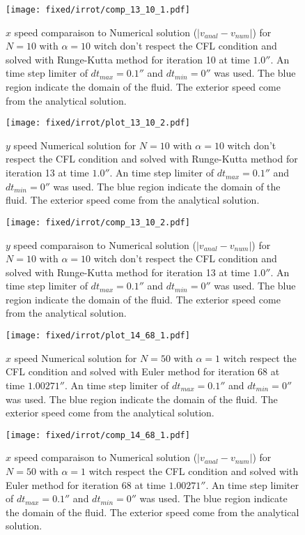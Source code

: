 \begin{figure}
\texttt{[image: fixed/irrot/comp\_13\_10\_1.pdf]}
\caption{$x$ speed comparaison to Numerical solution ($|v_{anal}-v_{num}|$) for $N=10$ with $\alpha=10$ witch don't respect the CFL condition and solved with Runge-Kutta method
for iteration 10 at time $\unit{1.0}{\second}$.
An time step limiter of $dt_{max}=\unit{0.1}{\second}$ and $dt_{min}=\unit{0}{\second}$ was used.
The blue region indicate the domain of the fluid. The exterior speed come from the analytical solution.
\label{fix:comp_13_10_1}
}
\end{figure}

\begin{figure}
\texttt{[image: fixed/irrot/plot\_13\_10\_2.pdf]}
\caption{$y$ speed Numerical solution for $N=10$ with $\alpha=10$ witch don't respect the CFL condition and solved with Runge-Kutta method
for iteration 13 at time $\unit{1.0}{\second}$.
An time step limiter of $dt_{max}=\unit{0.1}{\second}$ and $dt_{min}=\unit{0}{\second}$ was used.
The blue region indicate the domain of the fluid. The exterior speed come from the analytical solution.
\label{fix:plot_13_10_2}
}
\end{figure}

\begin{figure}
\texttt{[image: fixed/irrot/comp\_13\_10\_2.pdf]}
\caption{$y$ speed comparaison to Numerical solution ($|v_{anal}-v_{num}|$) for $N=10$ with $\alpha=10$ witch don't respect the CFL condition and solved with Runge-Kutta method
for iteration 13 at time $\unit{1.0}{\second}$.
An time step limiter of $dt_{max}=\unit{0.1}{\second}$ and $dt_{min}=\unit{0}{\second}$ was used.
The blue region indicate the domain of the fluid. The exterior speed come from the analytical solution.
\label{fix:comp_13_10_2}
}
\end{figure}

\clearpage
 
 
\begin{figure}
\texttt{[image: fixed/irrot/plot\_14\_68\_1.pdf]}
\caption{$x$ speed Numerical solution for $N=50$ with $\alpha=1$ witch respect the CFL condition and solved with Euler method
for iteration 68 at time $\unit{1.00271}{\second}$.
An time step limiter of $dt_{max}=\unit{0.1}{\second}$ and $dt_{min}=\unit{0}{\second}$ was used.
The blue region indicate the domain of the fluid. The exterior speed come from the analytical solution.
\label{fix:plot_14_68_1}
}
\end{figure}

\begin{figure}
\texttt{[image: fixed/irrot/comp\_14\_68\_1.pdf]}
\caption{$x$ speed comparaison to Numerical solution ($|v_{anal}-v_{num}|$) for $N=50$ with $\alpha=1$ witch respect the CFL condition and solved with Euler method
for iteration 68 at time $\unit{1.00271}{\second}$.
An time step limiter of $dt_{max}=\unit{0.1}{\second}$ and $dt_{min}=\unit{0}{\second}$ was used.
The blue region indicate the domain of the fluid. The exterior speed come from the analytical solution.
\label{fix:comp_14_68_1}
}
\end{figure}

